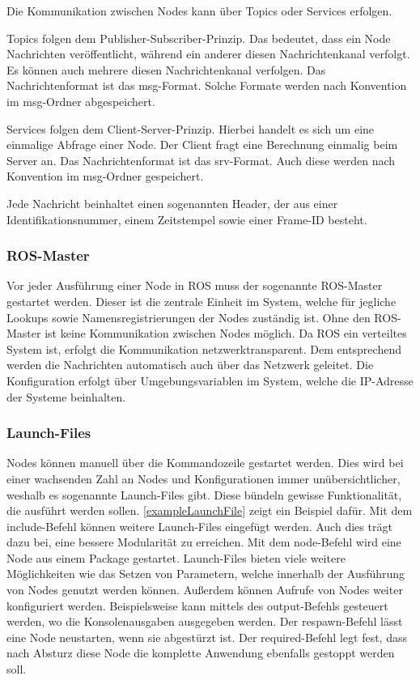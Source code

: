 Die Kommunikation zwischen Nodes kann über Topics oder Services erfolgen.

Topics folgen dem Publisher-Subscriber-Prinzip. Das bedeutet, dass ein Node Nachrichten veröffentlicht, während ein anderer diesen Nachrichtenkanal verfolgt. Es können auch mehrere diesen Nachrichtenkanal verfolgen. Das Nachrichtenformat ist das msg-Format. Solche Formate werden nach Konvention im msg-Ordner abgespeichert.

Services folgen dem Client-Server-Prinzip. Hierbei handelt es sich um eine einmalige Abfrage einer Node. Der Client fragt eine Berechnung einmalig beim Server an. Das Nachrichtenformat ist das srv-Format. Auch diese werden nach Konvention im msg-Ordner gespeichert.
    
Jede Nachricht beinhaltet einen sogenannten Header, der aus einer Identifikationsnummer, einem Zeitstempel sowie einer Frame-ID besteht.

\subsubsection{ROS-Master}

Vor jeder Ausführung einer Node in \ac{ROS} muss der sogenannte \ac{ROS}-Master gestartet werden. Dieser ist die zentrale Einheit im System, welche für jegliche Lookups sowie Namensregistrierungen der Nodes zuständig ist. Ohne den \ac{ROS}-Master ist keine Kommunikation zwischen Nodes möglich. Da \ac{ROS} ein verteiltes System ist, erfolgt die Kommunikation netzwerktransparent. Dem entsprechend werden die Nachrichten automatisch auch über das Netzwerk geleitet. Die Konfiguration erfolgt über Umgebungsvariablen im System, welche die IP-Adresse der Systeme beinhalten.

\subsubsection{Launch-Files}

Nodes können manuell über die Kommandozeile gestartet werden. Dies wird bei einer wachsenden Zahl an Nodes und Konfigurationen immer unübersichtlicher, weshalb es sogenannte Launch-Files gibt. Diese bündeln gewisse Funktionalität, die ausführt werden sollen. \autoref{exampleLaunchFile} zeigt ein Beispiel dafür. Mit dem include-Befehl können weitere Launch-Files eingefügt werden. Auch dies trägt dazu bei, eine bessere Modularität zu erreichen. Mit dem node-Befehl wird eine Node aus einem Package gestartet. Launch-Files bieten viele weitere Möglichkeiten wie das Setzen von Parametern, welche innerhalb der Ausführung von Nodes genutzt werden können. Außerdem können Aufrufe von Nodes weiter konfiguriert werden. Beispielsweise kann mittels des output-Befehls gesteuert werden, wo die Konsolenausgaben ausgegeben werden. Der respawn-Befehl lässt eine Node neustarten, wenn sie abgestürzt ist. Der required-Befehl legt fest, dass nach Absturz diese Node die komplette Anwendung ebenfalls gestoppt werden soll.

